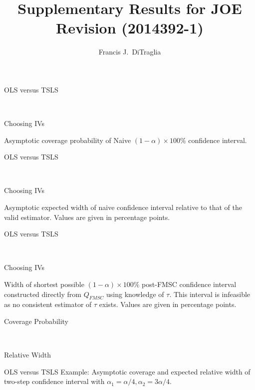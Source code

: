 \documentclass[12pt,letterpaper]{article}
\title{Supplementary Results for JOE Revision (2014392-1)}
\author{Francis J.\ DiTraglia}
\begin{document}
\maketitle


\begin{table}[h]
  \centering
  \begin{subtable}{0.48\textwidth}
    \caption{OLS versus TSLS}
    
  \end{subtable}
  ~
  \begin{subtable}{0.48\textwidth}
    \caption{Choosing IVs}
    
  \end{subtable}
  \caption{Asymptotic coverage probability of Naive $(1-\alpha)\times 100\%$ confidence interval.}
  \label{tab:LimitNaiveCover}
\end{table}

\begin{table}[h]
  \centering
  \begin{subtable}{0.48\textwidth}
    \caption{OLS versus TSLS}
    
  \end{subtable}
  ~
  \begin{subtable}{0.48\textwidth}
    \caption{Choosing IVs}
    
  \end{subtable}
  \caption{Asymptotic expected width of naive confidence interval relative to that of the valid estimator. Values are given in percentage points.}
  \label{tab:LimitNaiveWidth}
\end{table}

\begin{table}[h]
  \centering
  \begin{subtable}{0.48\textwidth}
    \caption{OLS versus TSLS}
    
  \end{subtable}
  ~
  \begin{subtable}{0.48\textwidth}
    \caption{Choosing IVs}
    
  \end{subtable}
  \caption{Width of shortest possible $(1-\alpha)\times 100\%$ post-FMSC confidence interval constructed directly from $Q_{FMSC}$ using knowledge of $\tau$. This interval is infeasible as no consistent estimator of $\tau$ exists. Values are given in percentage points.}
  \label{tab:WidthInfeasible}
\end{table}

\begin{table}[h]
  \centering
  \begin{subtable}{0.48\textwidth}
    \caption{Coverage Probability}
    
  \end{subtable}
  ~
  \begin{subtable}{0.48\textwidth}
    \caption{Relative Width}
    
  \end{subtable}
  \caption{OLS versus TSLS Example: Asymptotic coverage and expected relative width of two-step confidence interval with $\alpha_1 = \alpha/4,  \alpha_2 = 3\alpha/4$.}
  \label{tab:Limit2StepWideTauOLSvsIV}
\end{table}
\end{document}

